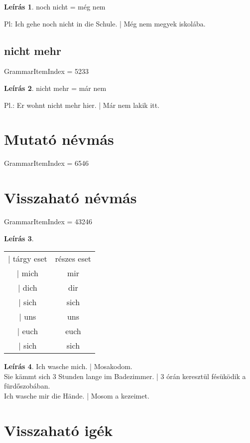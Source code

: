 \documentclass{article}
\theoremstyle{definition}
\newtheorem*{desc}{Leírás}
\begin{document}
\begin{desc}
noch nicht = még nem

Pl: Ich gehe noch nicht in die Schule. | Még nem megyek iskolába.
\end{desc}

\subsection{nicht mehr}

GrammarItemIndex = 5233

\begin{desc}
nicht mehr = már nem

Pl.: Er wohnt nicht mehr hier. | Már nem lakik itt.
\end{desc}

\section{Mutató névmás}

GrammarItemIndex = 6546

\section{Visszaható névmás}

GrammarItemIndex = 43246

\begin{desc}
\begin{tabular}{cc}
 | tárgy eset & részes eset \\
 | mich & mir \\
 | dich & dir \\
 | sich & sich \\
 | uns & uns \\
 | euch & euch \\
 | sich & sich \\
\end{tabular}
\end{desc}

\begin{desc}
Ich wasche mich. | Mosakodom. \\
Sie kämmt sich 3 Stunden lange im Badezimmer. | 3 órán keresztül fésüködik a fürdőszobában.\\
Ich wasche mir die Hände. | Mosom a kezeimet.
\end{desc}

\section{Visszaható igék}
\end{document}
